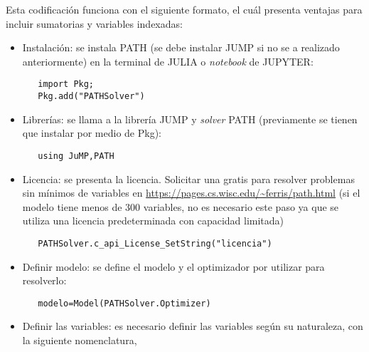 Esta codificación funciona con el siguiente formato, el cuál presenta ventajas para incluir sumatorias y variables indexadas: 

\begin{itemize}
 
\item Instalación: se instala PATH (se debe instalar JUMP si no se a realizado anteriormente) en la terminal de JULIA o \textit{notebook} de JUPYTER:\\

\begin{footnotesize}
   \begin{lstlisting}
   import Pkg;
   Pkg.add("PATHSolver")
   \end{lstlisting}
   \end{footnotesize}


\item Librerías: se llama a la librería JUMP y \textit{solver} PATH (previamente se tienen que instalar por medio de Pkg):
   
   \begin{footnotesize}
   \begin{lstlisting}
   using JuMP,PATH
   \end{lstlisting}
   \end{footnotesize}
   
    \item Licencia: se presenta la licencia. Solicitar una gratis para resolver problemas sin mínimos de variables en \url{https://pages.cs.wisc.edu/~ferris/path.html} (si el modelo tiene menos de 300 variables, no es necesario este paso ya que se utiliza una licencia predeterminada con capacidad limitada)
    \begin{footnotesize}
   \begin{lstlisting}
   PATHSolver.c_api_License_SetString("licencia")
   \end{lstlisting}
   \end{footnotesize}
    
   \item Definir modelo: se define el modelo y el optimizador por utilizar para resolverlo:
   
   \begin{footnotesize}
   \begin{lstlisting}
   modelo=Model(PATHSolver.Optimizer)
   \end{lstlisting}
   \end{footnotesize}
   
   \item Definir las variables: es necesario definir las variables según su naturaleza, con la siguiente nomenclatura,
   

\end{itemize}
